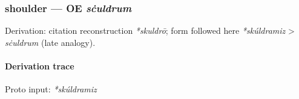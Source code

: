 \documentclass[
  british,
  a4paper,
]{article}
\begin{document}
\subsubsection{\texorpdfstring{shoulder --- OE
\emph{sċuldrum}}{shoulder --- OE sċuldrum}}\label{shoulder-oe-sux10buldrum}

Derivation: citation reconstruction \emph{*skuldrō}; form followed here
\emph{*skúldramiz} \textgreater{} \emph{sċuldrum} (late analogy).

\paragraph{Derivation trace}\label{derivation-trace-136}

Proto input: \emph{*skúldramiz}

\begingroup
\setlength{\fboxsep}{6pt}
\end{document}
